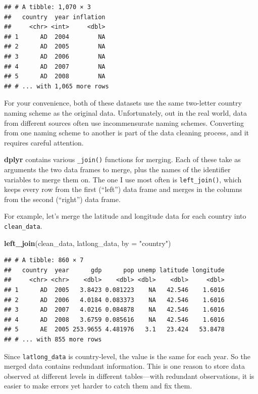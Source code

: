 \documentclass[12pt,oneside,openany]{book}
\newenvironment{Shaded}{\begin{snugshade}}{\end{snugshade}}
\newcommand{\KeywordTok}[1]{\textcolor[rgb]{0.13,0.29,0.53}{\textbf{#1}}}
\newcommand{\DataTypeTok}[1]{\textcolor[rgb]{0.13,0.29,0.53}{#1}}
\newcommand{\StringTok}[1]{\textcolor[rgb]{0.31,0.60,0.02}{#1}}
\newcommand{\NormalTok}[1]{#1}
\begin{document}
\begin{verbatim}
## # A tibble: 1,070 × 3
##   country  year inflation
##     <chr> <int>     <dbl>
## 1      AD  2004        NA
## 2      AD  2005        NA
## 3      AD  2006        NA
## 4      AD  2007        NA
## 5      AD  2008        NA
## # ... with 1,065 more rows
\end{verbatim}

For your convenience, both of these datasets use the same two-letter
country naming scheme as the original data. Unfortunately, out in the
real world, data from different sources often use incommensurate naming
schemes. Converting from one naming scheme to another is part of the
data cleaning process, and it requires careful attention.

\textbf{dplyr} contains various \texttt{\_join()} functions for merging.
Each of these take as arguments the two data frames to merge, plus the
names of the identifier variables to merge them on. The one I use most
often is \texttt{left\_join()}, which keeps every row from the first
(``left'') data frame and merges in the columns from the second
(``right'') data frame.

For example, let's merge the latitude and longitude data for each
country into \texttt{clean\_data}.

\begin{Shaded}
\begin{Highlighting}[]
\KeywordTok{left_join}\NormalTok{(clean_data,}
\NormalTok{          latlong_data,}
          \DataTypeTok{by =} \StringTok{"country"}\NormalTok{)}
\end{Highlighting}
\end{Shaded}

\begin{verbatim}
## # A tibble: 860 × 7
##   country  year      gdp      pop unemp latitude longitude
##     <chr> <chr>    <dbl>    <dbl> <dbl>    <dbl>     <dbl>
## 1      AD  2005   3.8423 0.081223    NA   42.546    1.6016
## 2      AD  2006   4.0184 0.083373    NA   42.546    1.6016
## 3      AD  2007   4.0216 0.084878    NA   42.546    1.6016
## 4      AD  2008   3.6759 0.085616    NA   42.546    1.6016
## 5      AE  2005 253.9655 4.481976   3.1   23.424   53.8478
## # ... with 855 more rows
\end{verbatim}

Since \texttt{latlong\_data} is country-level, the value is the same for
each year. So the merged data contains redundant information. This is
one reason to store data observed at different levels in different
tables---with redundant observations, it is easier to make errors yet
harder to catch them and fix them.
\end{document}
